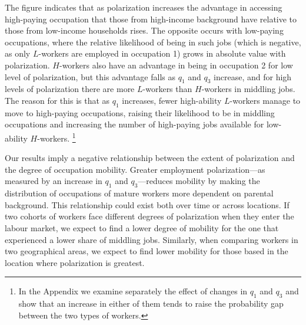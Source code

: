The figure indicates that as polarization increases the advantage in accessing high-paying occupation that those from high-income background have relative to those from low-income households rises. The opposite occurs with low-paying occupations, where the relative likelihood of being in such jobs (which is negative, as only $L$-workers are employed in occupation 1) grows in absolute value with polarization. $H$-workers also have an advantage in being in occupation 2 for low level of polarization, but this advantage falls as $q_1$ and $q_3$ increase, and for high levels of polarization there are more $L$-workers than $H$-workers in middling jobs. The reason for this is that as $q_1$ increases, fewer high-ability $L$-workers manage to move to high-paying occupations, raising their likelihood to be in middling occupations and increasing the number of high-paying jobs available for low-ability $H$-workers. \footnote{In the Appendix we examine separately the effect of changes in $q_1$ and $q_3$ and show that an increase in either of them tends to raise the probability gap between the two types of workers.}

Our results imply a negative relationship between the extent of polarization and the degree of occupation mobility. Greater employment polarization---as measured by an increase in $q_{1}$ and $q_{3}$---reduces mobility by making the distribution of occupations of mature workers more dependent on parental background. This relationship could exist both over time or across locations. If two cohorts of workers face different degrees of polarization when they enter the labour market, we expect to find a lower degree of mobility for the one that experienced a lower share of middling jobs. Similarly, when comparing workers in two geographical areas, we expect to find lower mobility for those based in the location where polarization is greatest.
